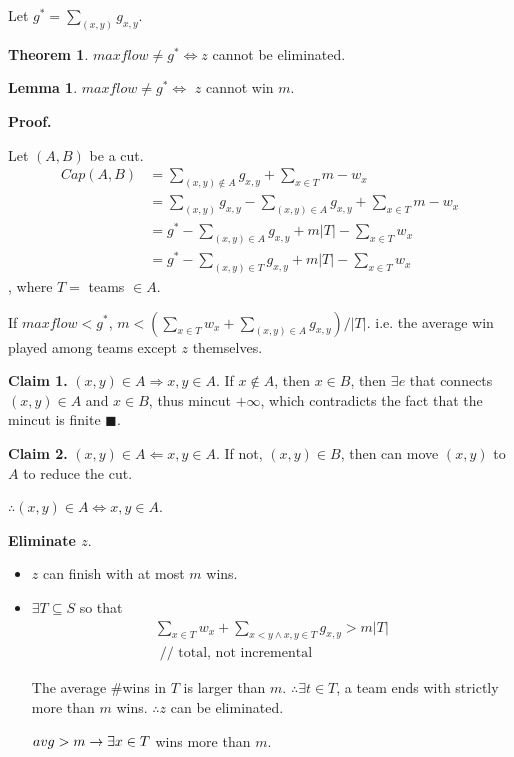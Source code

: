 \documentclass[a4paper]{report}
\theoremstyle{definition}
\newtheorem{thm}{Theorem}[section]
\newtheorem{lem}{Lemma}[section]
\begin{document}
Let $g^*=\sum_{(x,y)} g_{x, y}$.

\begin{thm}
$maxflow \neq g^* \Leftrightarrow z$ cannot be eliminated. 
\end{thm}
\begin{lem}
$maxflow \neq g^* \Leftrightarrow$ $z$ cannot win $m$.
\end{lem}

\textbf{Proof.}

Let $(A, B)$ be a cut.
\begin{align*}
Cap(A, B) &= \sum_{(x,y)\notin A} g_{x,y}+\sum_{x\in T} m-w_x\\
&= \sum_{(x,y)}g_{x, y}-\sum_{(x, y)\in A} g_{x, y}+\sum_{x\in T}m-w_x\\
&= g^*-\sum_{(x, y)\in A} g_{x, y}+m|T|-\sum_{x\in T}w_x\\
&= g^*-\sum_{(x, y)\in T} g_{x, y}+m|T|-\sum_{x\in T}w_x
\end{align*}
, where $T=$ teams $\in A$.

If $maxflow <g^*$, $m<(\sum_{x\in T} w_x+\sum_{(x,y)\in A} g_{x,y})/|T|$. i.e. the average win played among teams except $z$ themselves.

\textbf{Claim 1.} $(x,y)\in A \Rightarrow x,y \in A$. If $x \notin A$, then $x \in B$, then $\exists e$ that connects $(x,y)\in A$ and $x\in B$, thus mincut $+\infty$, which contradicts the fact that the mincut is finite $\blacksquare$.

\textbf{Claim 2.} $(x,y)\in A \Leftarrow x,y \in A$. If not, $(x,y)\in B$, then can move $(x, y)$ to $A$ to reduce the cut. 

$\therefore (x,y)\in A \Leftrightarrow x,y \in A$. 

\textbf{Eliminate $z$}.
\begin{itemize}
\item $z$ can finish with at most $m$ wins.
\item $\exists T\subseteq S$ so that
\begin{align*}
\sum_{x\in T} w_x + \sum_{x<y \wedge x, y \in T} g_{x, y} > m|T|  \\
\text{ // total, not incremental }
\end{align*}


The average \#wins in $T$ is larger than $m$. $\therefore \exists t \in T$, a team ends with strictly more than $m$ wins. $\therefore z$  can be eliminated.

$avg > m \rightarrow \exists x\in T$ wins more than $m$. 
\end{itemize}
\end{document}
